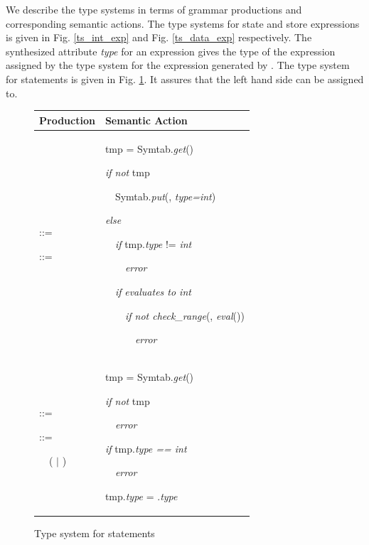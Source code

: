 We describe the type systems in terms of grammar productions and corresponding semantic actions. The type systems for state and store expressions is given in Fig. \ref{ts_int_exp} and Fig. \ref{ts_data_exp} respectively. The synthesized attribute \emph{type} for an expression  gives the type of the expression assigned by the type system for the expression generated by . The type system for statements is given in Fig. \ref{ts_stmt}. It assures that the left hand side can be assigned to.


\begin{figure}[h!]
\def\arraystretch{2} 
\begin{tabular*}{1\textwidth}{p{}|p{}}
\hline
Production & Semantic Action\\

\hline

\parbox{0.5\textwidth}{
 ::=  \tangled{=} \tangled{[}  \tangled{]}

 ::= 
} & \parbox{0.5\textwidth}{
tmp = Symtab.\emph{get}()

\emph{if not} tmp

~~Symtab.\emph{put}(, \emph{type=int})

\emph{else}

~~\emph{if} tmp.\emph{type} != \emph{int}

~~~~\emph{error}

~~\emph{if}  \emph{evaluates to int}

~~~~\emph{if not check\_range}(, \emph{eval}())

~~~~~~\emph{error}
}\\

\hline

\parbox{0.5\textwidth}{
 ::=  \tangled{=} 

 ::=

~~( $\mid$ \tangled{(}  \tangled{)})

} & \parbox{0.5\textwidth}{
tmp = Symtab.\emph{get}()

\emph{if not} tmp

~~\emph{error}

\emph{if} tmp.\emph{type == int}

~~\emph{error}

tmp.\emph{type} = .\emph{type}
}\\

\hline

\end{tabular*}
\caption{Type system for statements\label{ts_stmt}}
\end{figure}



